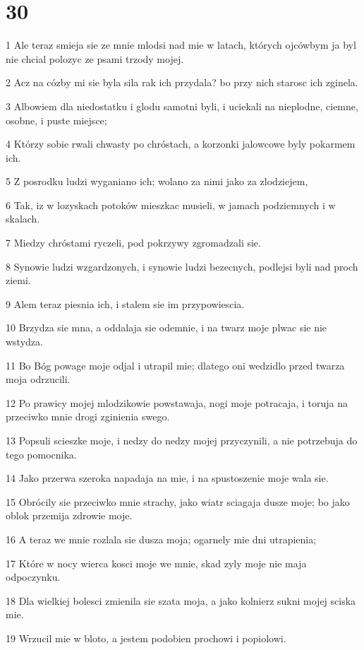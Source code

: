 \chapter{30}

\par 1 Ale teraz smieja sie ze mnie mlodsi nad mie w latach, których ojcówbym ja byl nie chcial polozyc ze psami trzody mojej.
\par 2 Acz na cózby mi sie byla sila rak ich przydala? bo przy nich starosc ich zginela.
\par 3 Albowiem dla niedostatku i glodu samotni byli, i uciekali na nieplodne, ciemne, osobne, i puste miejsce;
\par 4 Którzy sobie rwali chwasty po chróstach, a korzonki jalowcowe byly pokarmem ich.
\par 5 Z posrodku ludzi wyganiano ich; wolano za nimi jako za zlodziejem,
\par 6 Tak, iz w lozyskach potoków mieszkac musieli, w jamach podziemnych i w skalach.
\par 7 Miedzy chróstami ryczeli, pod pokrzywy zgromadzali sie.
\par 8 Synowie ludzi wzgardzonych, i synowie ludzi bezecnych, podlejsi byli nad proch ziemi.
\par 9 Alem teraz piesnia ich, i stalem sie im przypowiescia.
\par 10 Brzydza sie mna, a oddalaja sie odemnie, i na twarz moje plwac sie nie wstydza.
\par 11 Bo Bóg powage moje odjal i utrapil mie; dlatego oni wedzidlo przed twarza moja odrzucili.
\par 12 Po prawicy mojej mlodzikowie powstawaja, nogi moje potracaja, i toruja na przeciwko mnie drogi zginienia swego.
\par 13 Popsuli scieszke moje, i nedzy do nedzy mojej przyczynili, a nie potrzebuja do tego pomocnika.
\par 14 Jako przerwa szeroka napadaja na mie, i na spustoszenie moje wala sie.
\par 15 Obrócily sie przeciwko mnie strachy, jako wiatr sciagaja dusze moje; bo jako oblok przemija zdrowie moje.
\par 16 A teraz we mnie rozlala sie dusza moja; ogarnely mie dni utrapienia;
\par 17 Które w nocy wierca kosci moje we mnie, skad zyly moje nie maja odpoczynku.
\par 18 Dla wielkiej bolesci zmienila sie szata moja, a jako kolnierz sukni mojej sciska mie.
\par 19 Wrzucil mie w bloto, a jestem podobien prochowi i popiolowi.
